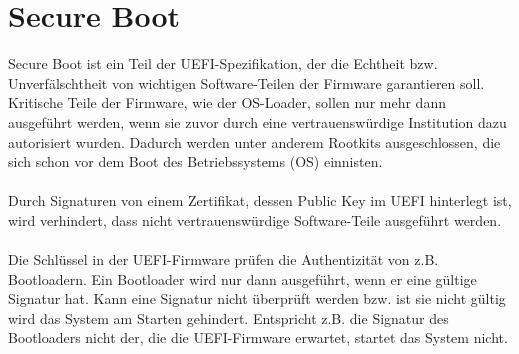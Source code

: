 \section{Secure Boot}
Secure Boot ist ein Teil der UEFI-Spezifikation, der die Echtheit bzw. Unverfälschtheit von wichtigen Software-Teilen der Firmware garantieren soll. Kritische Teile der Firmware, wie der OS-Loader, sollen nur mehr dann ausgeführt werden, wenn sie zuvor durch eine vertrauenswürdige Institution dazu autorisiert wurden. Dadurch werden unter anderem Rootkits ausgeschlossen, die sich schon vor dem Boot des Betriebssystems (OS) einnisten.
\\ \\
Durch Signaturen von einem Zertifikat, dessen Public Key im UEFI hinterlegt ist, wird verhindert, dass nicht vertrauenswürdige Software-Teile ausgeführt werden.
\\ \\
Die Schlüssel in der UEFI-Firmware prüfen die Authentizität von z.B. Bootloadern. Ein Bootloader wird nur dann ausgeführt, wenn er eine gültige Signatur hat. Kann eine Signatur nicht überprüft werden bzw. ist sie nicht gültig wird das System am Starten gehindert. Entspricht z.B. die Signatur des Bootloaders nicht der, die die UEFI-Firmware erwartet, startet das System nicht. 
